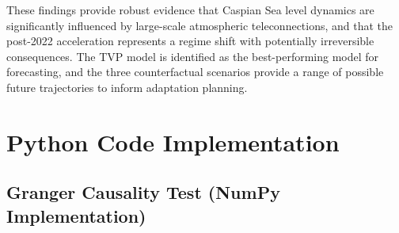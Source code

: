 \documentclass[12pt,a4paper,twocolumn]{article}
\begin{document}
These findings provide robust evidence that Caspian Sea level dynamics are significantly influenced by large-scale atmospheric teleconnections, and that the post-2022 acceleration represents a regime shift with potentially irreversible consequences. The TVP model is identified as the best-performing model for forecasting, and the three counterfactual scenarios provide a range of possible future trajectories to inform adaptation planning.

\appendix
\section{Python Code Implementation}

\subsection{Granger Causality Test (NumPy Implementation)}
\end{document}
